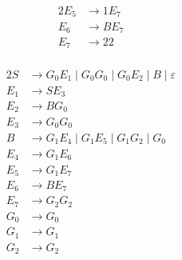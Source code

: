 \documentclass[docid=TP10]{tcom_TP}
\begin{document}
{\begin{center}
\begin{minipage}[c]{0.3\textwidth}
\begin{alignat*}{2}
	E_5 &\rightarrow 1E_7 \\
	E_6 &\rightarrow BE_7\\
	E_7 &\rightarrow 22\\
\end{alignat*} \end{minipage}%
\begin{minipage}[c]{0.4\textwidth} \begin{alignat*}{2}
	S &\rightarrow G_0E_1\mid G_0G_0\mid G_0E_2\mid B\mid \varepsilon\\
	E_1 &\rightarrow SE_3\\
	E_2 &\rightarrow BG_0\\
	E_3 &\rightarrow G_0G_0\\
	B &\rightarrow G_1E_4\mid G_1E_5\mid G_1G_2\mid G_0\\
	E_4 &\rightarrow G_1E_6\\
	E_5 &\rightarrow G_1E_7 \\
	E_6 &\rightarrow BE_7\\
	E_7 &\rightarrow G_2G_2\\
	G_0 &\rightarrow G_0\\
	G_1 &\rightarrow G_1\\
	G_2 &\rightarrow G_2
\end{alignat*} \end{minipage}
\end{center}
}
\end{document}
